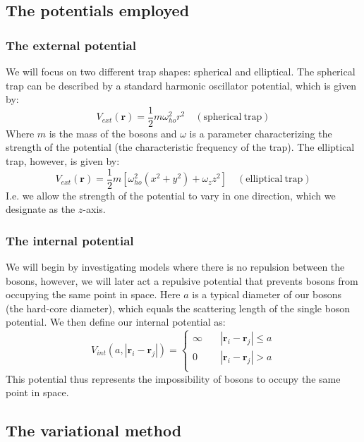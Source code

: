 \documentclass[a4paper, 10pt]{article}
\begin{document}
	\subsection{The potentials employed}
	\subsubsection{The external potential}
	We will focus on two different trap shapes: spherical and elliptical. The spherical trap can be described by a standard harmonic oscillator potential, which is given by:
	\begin{equation}
	V_{ext}(\boldsymbol{r})=\frac{1}{2}m\omega_{ho}^2 r^2 \quad \mathrm{(spherical\  trap)}
	\end{equation}
	Where $m$ is the mass of the bosons and $\omega$ is a parameter characterizing the strength of the potential (the characteristic frequency of the trap). The elliptical trap, however, is given by:
	\begin{equation}
	V_{ext}(\boldsymbol{r})=\frac{1}{2}m[\omega_{ho}^2 (x^2+y^2)+\omega_z z^2] \quad \mathrm{(elliptical\  trap)}
	\end{equation}
	I.e. we allow the strength of the potential to vary in one direction, which we designate as the $z$-axis.
	\subsubsection{The internal potential}
	We will begin by investigating models where there is no repulsion between the bosons, however, we will later act a repulsive potential that prevents bosons from occupying the same point in space. Here $a$ is a typical diameter of our bosons (the hard-core diameter), which equals the scattering length of the single boson potential. We then define our internal potential as:
	\begin{equation}
	V_{int}(a,|\boldsymbol{r}_i-\boldsymbol{r}_j|)= 
	\begin{cases}
	\infty & \quad |\boldsymbol{r}_i-\boldsymbol{r}_j| \leq  a\\
	0 & \quad |\boldsymbol{r}_i-\boldsymbol{r}_j|>  a\\
	\end{cases}
	\end{equation}
	This potential thus represents the impossibility of bosons to occupy the same point in space.
	\subsection{The variational method}
\end{document}
